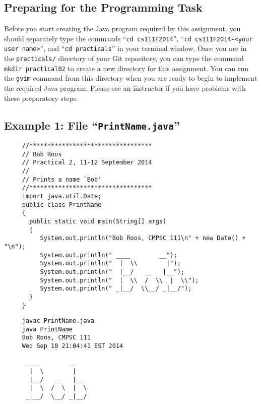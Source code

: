 \subsection*{Preparing for the Programming Task}

Before you start creating the Java program required by this assignment, you should separately type the commands ``{\tt cd
  cs111F2014}'', ``{\tt cd cs111F2014-<your user name>}'', and ``{\tt cd practicals}'' in your terminal window. Once you
are in the {\tt practicals/} directory of your Git repository, you can type the command {\tt mkdir practical02} to 
create a new directory for this assignment. You can run the {\tt gvim} command from this directory when you are ready to
begin to implement the required Java program. Please see an instructor if you have problems with these preparatory steps.


\subsection*{Example 1: File ``{\tt PrintName.java}''}
\begin{verbatim}
     //**********************************
     // Bob Roos
     // Practical 2, 11-12 September 2014
     //
     // Prints a name `Bob'
     //**********************************
     import java.util.Date;
     public class PrintName
     {
       public static void main(String[] args)
       {
          System.out.println("Bob Roos, CMPSC 111\n" + new Date() + "\n");
          System.out.println(" ____        __");
          System.out.println("  |  \\        |");
          System.out.println("  |__/   __   |__");
          System.out.println("  |  \\  /  \\  |  \\");
          System.out.println(" _|__/  \\__/ _|__/");
       }
     }
\end{verbatim}

\begin{verbatim}
     javac PrintName.java
     java PrintName
     Bob Roos, CMPSC 111
     Wed Sep 10 21:04:41 EST 2014
     
      ____        __
       |  \        |
       |__/   __   |__
       |  \  /  \  |  \
      _|__/  \__/ _|__/
\end{verbatim}

\newpage

